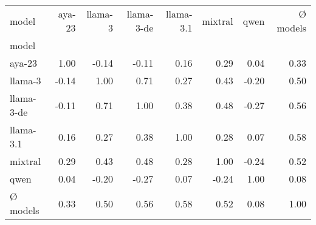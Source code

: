 \begin{tabular}{lrrrrrrr}
\toprule
model & aya-23 & llama-3 & llama-3-de & llama-3.1 & mixtral & qwen & Ø models \\
model &  &  &  &  &  &  &  \\
\midrule
aya-23 & 1.00 & -0.14 & -0.11 & 0.16 & 0.29 & 0.04 & 0.33 \\
llama-3 & -0.14 & 1.00 & 0.71 & 0.27 & 0.43 & -0.20 & 0.50 \\
llama-3-de & -0.11 & 0.71 & 1.00 & 0.38 & 0.48 & -0.27 & 0.56 \\
llama-3.1 & 0.16 & 0.27 & 0.38 & 1.00 & 0.28 & 0.07 & 0.58 \\
mixtral & 0.29 & 0.43 & 0.48 & 0.28 & 1.00 & -0.24 & 0.52 \\
qwen & 0.04 & -0.20 & -0.27 & 0.07 & -0.24 & 1.00 & 0.08 \\
Ø models & 0.33 & 0.50 & 0.56 & 0.58 & 0.52 & 0.08 & 1.00 \\
\bottomrule
\end{tabular}
